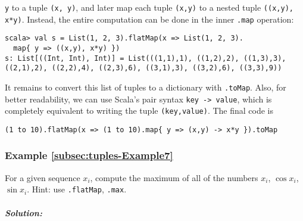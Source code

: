 \lstinline!y! to a tuple
\lstinline!(x, y)!, and
later map each tuple \lstinline!(x,y)!
to a nested tuple \lstinline!((x,y), x*y)!.
Instead, the entire computation can be done in the inner \lstinline!.map!
operation:
\begin{lstlisting}
scala> val s = List(1, 2, 3).flatMap(x => List(1, 2, 3).
  map{ y => ((x,y), x*y) })
s: List[((Int, Int), Int)] = List(((1,1),1), ((1,2),2), ((1,3),3), ((2,1),2), ((2,2),4), ((2,3),6), ((3,1),3), ((3,2),6), ((3,3),9))
\end{lstlisting}
It remains to convert this list of tuples to a dictionary with \lstinline!.toMap!.
Also, for better readability, we can use Scala's pair syntax \lstinline!key -> value!,
which is completely equivalent to writing the tuple \lstinline!(key,value)!.
The final code is

\begin{lstlisting}
(1 to 10).flatMap(x => (1 to 10).map{ y => (x,y) -> x*y }).toMap
\end{lstlisting}

\subsubsection{Example \label{subsec:tuples-Example7}\ref{subsec:tuples-Example7}}

For a given sequence $x_{i}$, compute the maximum of all of the numbers
$x_{i}$, $\cos x_{i}$, $\sin x_{i}$. Hint: use \lstinline!.flatMap!,
\lstinline!.max!.

\subparagraph{Solution:}

